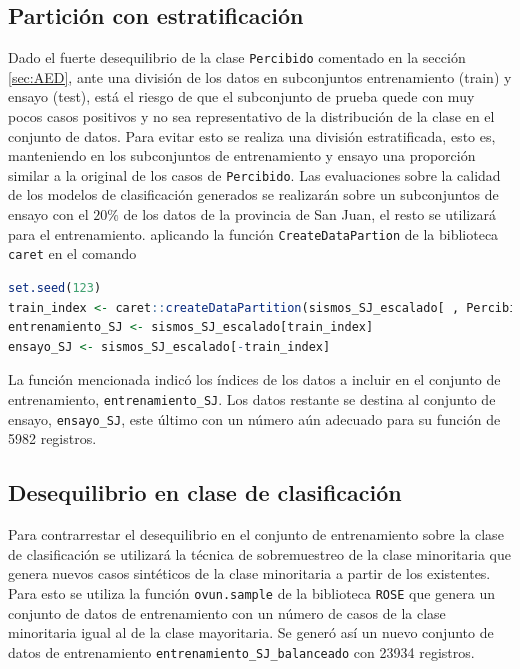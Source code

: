\documentclass[a4paper]{report}
\begin{document}
\subsection{Partición con estratificación}\label{sec:partición}

Dado el fuerte desequilibrio de la clase \texttt{Percibido} comentado en la sección \ref{sec:AED}, ante una división de los datos en subconjuntos entrenamiento (train) y ensayo (test), está el riesgo de que el subconjunto de prueba quede con muy pocos casos positivos y no sea representativo de la distribución de la clase en el conjunto de datos. 
Para evitar esto se realiza una división estratificada, esto es, 
manteniendo en los subconjuntos de entrenamiento y ensayo una proporción similar a la original de los casos de \verb'Percibido'.
Las evaluaciones sobre la calidad de los modelos de clasificación generados se realizarán sobre un subconjuntos de ensayo con el \(20 \%\) de los datos de la provincia de San Juan, el resto se utilizará para el entrenamiento.
aplicando la función \lstinline[language = R]'CreateDataPartion' de la biblioteca \lstinline[language = R]'caret' en el comando

\begin{lstlisting}[breaklines=true, language=R]
set.seed(123)
train_index <- caret::createDataPartition(sismos_SJ_escalado[ , Percibido], p = 0.8, list = FALSE)
entrenamiento_SJ <- sismos_SJ_escalado[train_index]
ensayo_SJ <- sismos_SJ_escalado[-train_index]
\end{lstlisting}

La función mencionada indicó los índices de los datos a incluir en el conjunto de entrenamiento, \lstinline[language = R]'entrenamiento_SJ'.
Los datos restante se destina al conjunto de ensayo, \lstinline[language = R]'ensayo_SJ', este último con un número aún adecuado para su función de \num{5982} registros.


\subsection{Desequilibrio en clase de clasificación}\label{sec:balanceo}
Para contrarrestar el desequilibrio en el conjunto de entrenamiento sobre la clase de clasificación se utilizará la técnica de sobremuestreo de la clase minoritaria que genera nuevos casos sintéticos de la clase minoritaria a partir de los existentes.
Para esto se utiliza la función \lstinline[language = R]'ovun.sample' de la biblioteca \lstinline[language = R]'ROSE' que genera un conjunto de datos de entrenamiento con un número de casos de la clase minoritaria igual al de la clase mayoritaria.
Se generó así un nuevo conjunto de datos de entrenamiento \lstinline[language = R]'entrenamiento_SJ_balanceado' con \num{23934} registros.
\end{document}
